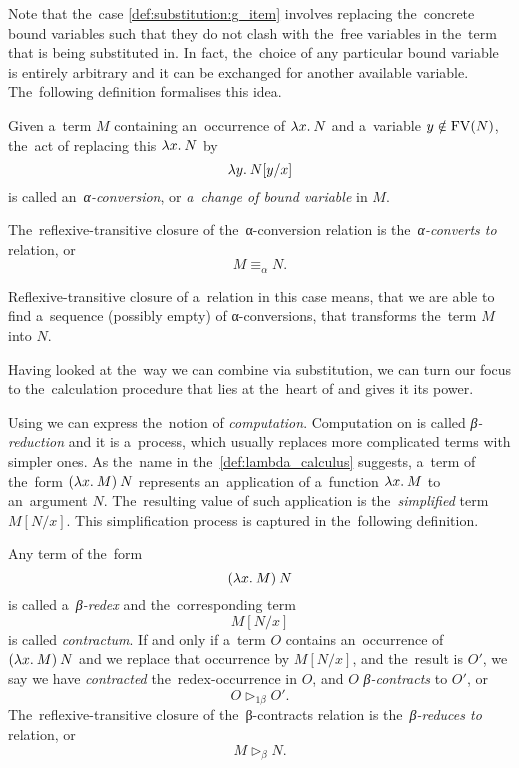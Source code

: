 Note that the~case \ref{def:substitution:g_item} involves replacing the~concrete
bound variables such that they do not clash with the~free variables in the~term
that is being substituted in. In fact, the~choice of any particular bound
variable is entirely arbitrary and it can be exchanged for another available
variable. The~following definition formalises this idea.

\begin{definition}
  Given a~term $M$ containing an~occurrence of $\lambda x . \: N$ and a~variable $y
  \notin \mathrm{FV}(N)$, the~act of replacing this $\lambda x . \: N$ by
  \[
    \lambda y . \: N[y/x]
  \]
  is called an~\emph{α-conversion}, or \emph{a~change of bound variable} in $M$.

  The~reflexive-transitive closure of the~α-conversion relation is
  the~\emph{α-converts to} relation, or
  \[
    M \equiv_\alpha N.
  \]
\end{definition}

Reflexive-transitive closure of a~relation in this case means, that we are able
to find a~sequence (possibly empty) of α-conversions, that transforms the~term
$M$ into $N$.

Having looked at the~way we can combine \lts via substitution, we can turn our
focus to the~calculation procedure that lies at the~heart of \lc and gives it
its power.


Using \lc we can express the~notion of \emph{computation}. Computation on \lts
is called \emph{β-reduction} and it is a~process, which usually replaces more
complicated terms with simpler ones. As the~name in
the~\autoref{def:lambda_calculus} suggests, a~term of the~form $(\lambda x . \: M) \: N$
represents an~application of a~function $\lambda x . \: M$ to an~argument $N$.
The~resulting value of such application is the~\emph{simplified} term $M[N/x]$.
This simplification process is captured in the~following definition.

\begin{definition}
  Any term of the~form
  \[
    (\lambda x . \: M) \: N
  \]
  is called a~\emph{β-redex} and the~corresponding term
  \[
    M[N/x]
  \]
  is called \emph{contractum}. If and only if a~term $O$ contains an~occurrence
  of $(\lambda x . \: M) \: N$ and we replace that occurrence by $M[N/x]$, and
  the~result is $O'$, we say we have \emph{contracted} the~redex-occurrence in
  $O$, and $O$ \emph{β-contracts} to $O'$, or
  \[
    O \triangleright_{1\beta} O'.
  \]
  The~reflexive-transitive closure of the~β-contracts relation is
  the~\emph{β-reduces to} relation, or
  \[
    M \triangleright_\beta N.
  \]
\end{definition}

